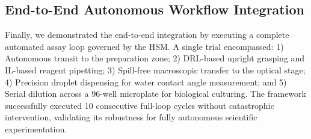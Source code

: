 \documentclass[journal,twocolumn]{IEEEtran}
\begin{document}
\subsection{End-to-End Autonomous Workflow Integration}
\label{subsec:exp_end_to_end}

Finally, we demonstrated the end-to-end integration by executing a complete automated assay loop governed by the HSM. A single trial encompassed:
1) Autonomous transit to the preparation zone;
2) DRL-based upright grasping and IL-based reagent pipetting;
3) Spill-free macroscopic transfer to the optical stage;
4) Precision droplet dispensing for water contact angle measurement; and
5) Serial dilution across a 96-well microplate for biological culturing.
The framework successfully executed 10 consecutive full-loop cycles without catastrophic intervention, validating its robustness for fully autonomous scientific experimentation.
\end{document}
